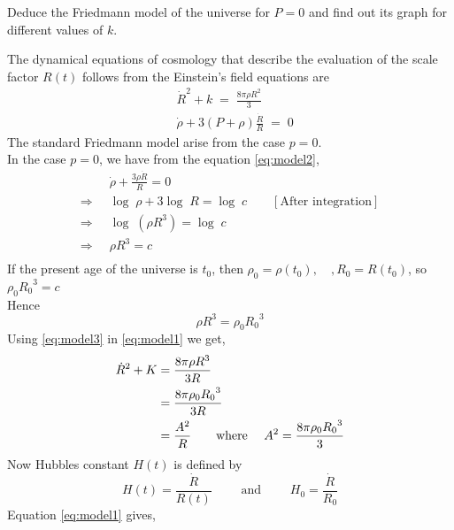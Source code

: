 \documentclass[../main-sheet.tex]{subfiles}
\begin{document}
\begin{prob}
    Deduce the Friedmann model of the universe for \(P=0 \) and find out its graph for different values of \(k \).
\end{prob}
\begin{soln}
    The dynamical equations of cosmology that describe the evaluation of the scale factor \(R(t)\) follows from the Einstein's field equations are
    \begin{align}
        &\dot{R}^2+k\;=\;\frac{8\pi\rho R^2}{3}\label{eq:model1}\\
        &\dot{\rho}+3(P+\rho)\frac{\dot{R }}{R }\;=\;0\label{eq:model2}
    \end{align}
The standard Friedmann model arise from the case \(p = 0\).\\
In the case \(p = 0\), we have from the equation \eqref{eq:model2},
\begin{align*}
    &\dot{\rho}+\frac{3\rho \dot{R }}{R }=0\\
    \Rightarrow\;\;&\log\;\rho+3\log\;{R }=\log\;c \qquad[\text{After integration}]\\
    \Rightarrow\;\;&\log\;\left(\rho{R }^3\right)=\log\;c\\
    \Rightarrow\;\;&\rho{R }^3=c\\
\end{align*}
If the present age of the universe is \(t_0\), then
\(\rho_0=\rho(t_0),\quad, R_0=R(t_0)\), so \(\rho_0 {R_0}^3=c\)\\
Hence
\begin{equation}
    \rho{R }^3=\rho_0 {R_0}^3 \label{eq:model3}
\end{equation}
Using \eqref{eq:model3} in \eqref{eq:model1} we get,
\begin{align}
    \dot{R}^2+K&=\frac{8\pi\rho R^3}{3R}\notag\\
    &=\frac{8\pi\rho_0 {R_0}^3}{3R}\notag\\
    &=\frac{A^2 }{R }\qquad\text{where   }\quad A^2=\frac{8\pi\rho_0 {R_0}^3}{3}\label{eq:model4}
\end{align}
Now Hubbles constant \(H(t)\) is defined by
\begin{equation}
    H(t)=\frac{\dot{R }}{R(t )}\qquad\text{ and }\qquad H_0=\frac{\dot{R }}{R_0}\label{eq:model5}
\end{equation}
Equation \eqref{eq:model1} gives,

\end{soln}
\end{document}
